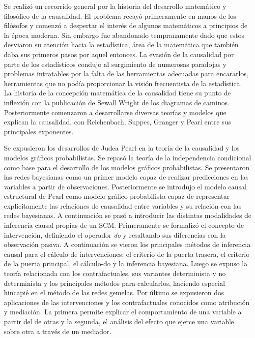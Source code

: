 \begin{conclusions}
	Se realizó un recorrido general por la historia del desarrollo matemático y filosófico de la causalidad. El problema recayó primeramente en manos de los filósofos y comenzó a despertar el interés de algunos matemáticos a principios de la época moderna. Sin embargo fue abandonado tempranamente dado que estos desviaron su atención hacia la estadística, área de la matemática que también daba sus primeros pasos por aquel entonces. La evasión de la causalidad por parte de los estadísticos condujo al surgimiento de numerosas paradojas y problemas intratables por la falta de las herramientas adecuadas para encararlos, herramientas que no podía proporcionar la visión frecuentista de la estadística. La historia de la concepción matemática de la causalidad tiene su punto de inflexión con la publicación de Sewall Wright de los diagramas de caminos. Posteriormente comenzaron a desarrollarse diversas teorías y modelos que explican la causalidad, con Reichenbach, Suppes, Granger y Pearl entre sus principales exponentes.
	
	Se expusieron los desarrollos de Judea Pearl en la teoría de la causalidad y los modelos gráficos probabilistas. Se repasó la teoría de la independencia condicional como base para el desarrollo de los modelos gráficos probabilistas. Se presentaron las redes bayesianas como un primer modelo capaz de realizar predicciones en las variables a partir de observaciones. Posteriormente se introdujo el modelo causal estructural de Pearl como modelo gráfico probabilista capaz de representar explícitamente las relaciones de causalidad entre variables y su relación con las redes bayesianas. A continuación se pasó a introducir las distintas modalidades de inferencia causal propias de un SCM. Primeramente se formalizó el concepto de intervención, definiendo el operador \textit{do} y resaltando sus diferencias con la observación pasiva. A continuación se vieron los principales métodos de inferencia causal para el cálculo de intervenciones: el criterio de la puerta trasera, el criterio de la puerta principal, el cálculo-do y la inferencia bayesiana. Luego se expuso la teoría relacionada con los contrafactuales, sus variantes determinista y no determinista y los principales métodos para calcularlos, haciendo especial hincapié en el método de las redes gemelas. Por último se expusieron dos aplicaciones de las intervenciones y los contrafactuales conocidos como atribución y mediación. La primera permite explicar el comportamiento de una variable a partir del de otras y la segunda, el análisis del efecto que ejerce una variable sobre otra a través de un mediador.
	

\end{conclusions}
